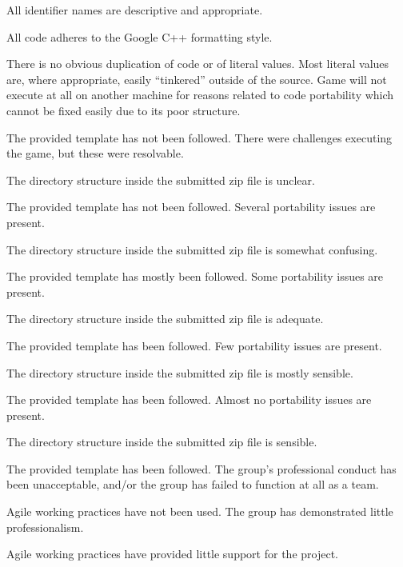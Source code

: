 \documentclass{../fal_assignment}
\begin{document}
\begin{markingrubric}
            \par All identifier names are descriptive and appropriate.
            \par All code adheres to the Google C++ formatting style.
             \par There is no obvious duplication of code or of literal values. Most literal values are, where appropriate, easily ``tinkered'' outside of the source.  
%
        \grade\fail Game will not execute at all on another machine for reasons related to code portability which cannot be fixed easily due to its poor structure.
            \par The provided template has not been followed.
        \grade There were challenges executing the game, but these were resolvable.
            \par The directory structure inside the submitted zip file is unclear.
            \par The provided template has not been followed.
        \grade Several portability issues are present.
            \par The directory structure inside the submitted zip file is somewhat confusing.
            \par The provided template has mostly been followed.
        \grade Some portability issues are present.
            \par The directory structure inside the submitted zip file is adequate.
            \par The provided template has been followed.
        \grade Few portability issues are present.
            \par The directory structure inside the submitted zip file is mostly sensible.
            \par The provided template has been followed.
        \grade Almost no portability issues are present.
            \par The directory structure inside the submitted zip file is sensible.
            \par The provided template has been followed.
%
        \grade\fail The group's professional conduct has been unacceptable,
            and/or the group has failed to function at all as a team.
            \par Agile working practices have not been used.
        \grade The group has demonstrated little professionalism.
            \par Agile working practices have provided little support for the project.

\end{markingrubric}
\end{document}
